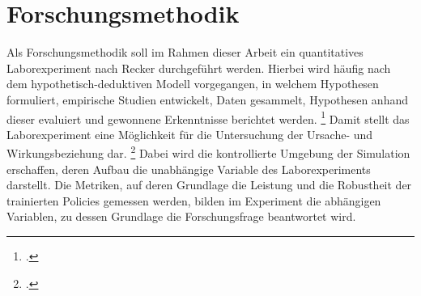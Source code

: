 \section{Forschungsmethodik}

Als Forschungsmethodik soll im Rahmen dieser Arbeit ein quantitatives Laborexperiment nach Recker \cite*[]{Recker.2021} durchgeführt werden.
Hierbei wird häufig nach dem hypothetisch-deduktiven Modell vorgegangen, in welchem Hypothesen formuliert, empirische Studien entwickelt, Daten gesammelt, Hypothesen anhand dieser evaluiert und gewonnene Erkenntnisse berichtet werden. \footcite[Vgl.][S. S.89f.]{Recker.2021}
Damit stellt das Laborexperiment eine Möglichkeit für die Untersuchung der Ursache- und Wirkungsbeziehung dar. \footcite[Vgl.][S. 106]{Recker.2021}
Dabei wird die kontrollierte Umgebung der Simulation erschaffen, deren Aufbau die unabhängige Variable des Laborexperiments darstellt.
Die Metriken, auf deren Grundlage die Leistung und die Robustheit der trainierten Policies gemessen werden, bilden im Experiment die abhängigen Variablen, zu dessen Grundlage die Forschungsfrage beantwortet wird.